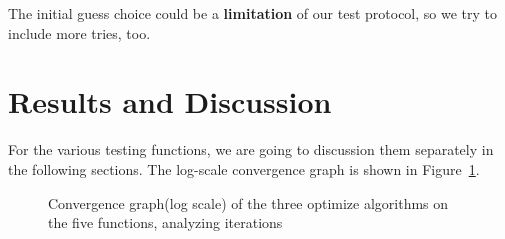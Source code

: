 \documentclass[12pt]{article}
\begin{document}
The initial guess choice could be a \textbf{limitation} of our test protocol, so we try to include more tries, too.

\section{Results and Discussion}

For the various testing functions, we are going to discussion them separately in the following sections. The log-scale convergence graph is shown in Figure~\ref{fig:convgraph}.

\begin{figure}[ht]
\centering
{}
\caption[]{Convergence graph(log scale) of the three optimize algorithms on the five functions, analyzing iterations}
\label{fig:convgraph}
\end{figure}
\end{document}
